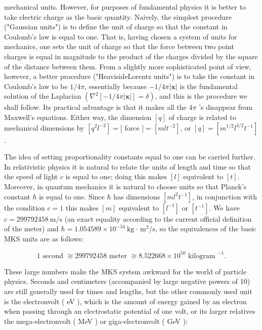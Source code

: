\documentclass[10pt, letterpaper]{article}
\begin{document}
mechanical units. However, for purposes of fundamental physics it is better to take electric charge as the basic quantity. Naively, the simplest procedure ("Gaussian units") is to define the unit of charge so that the constant in Coulomb's law is equal to one. That is, having chosen a system of units for mechanics, one sets the unit of charge so that the force between two point charges is equal in magnitude to the product of the charges divided by the square of the distance between them. From a slightly more sophisticated point of view, however, a better procedure ("HeavisideLorentz units") is to take the constant in Coulomb's law to be $1 / 4 \pi$, essentially because $-1 / 4 \pi|\mathbf{x}|$ is the fundamental solution of the Laplacian $\left(\nabla^{2}[-1 / 4 \pi|\mathbf{x}|]=\delta\right)$, and this is the procedure we shall follow. Its practical advantage is that it makes all the $4 \pi$ 's disappear from Maxwell's equations. Either way, the dimension $[q]$ of charge is related to mechanical dimensions by $\left[q^{2} l^{-2}\right]=[$ force $]=\left[m l t^{-2}\right]$, or $[q]=\left[m^{1 / 2} l^{3 / 2} t^{-1}\right]$.

The idea of setting proportionality constants equal to one can be carried further. In relativistic physics it is natural to relate the units of length and time so that the speed of light $c$ is equal to one; doing this makes $[l]$ equivalent to $[t]$. Moreover, in quantum mechanics it is natural to choose units so that Planck's constant $\hbar$ is equal to one. Since $\hbar$ has dimensions $\left[m l^{2} t^{-1}\right]$, in conjunction with the condition $c=1$ this makes $[m]$ equivalent to $\left[l^{-1}\right]$ or $\left[t^{-1}\right]$. We have $c=299792458 \mathrm{~m} / \mathrm{s}$ (an exact equality according to the current official definition of the meter) and $\hbar=1.054589 \times 10^{-34} \mathrm{~kg} \cdot \mathrm{~m}^{2} / \mathrm{s}$, so the equivalences of the basic MKS units are as follows:

$$
1 \text { second } \cong 299792458 \text { meter } \cong 8.522668 \times 10^{50} \text { kilogram }^{-1} .
$$

These large numbers make the MKS system awkward for the world of particle physics. Seconds and centimeters (accompanied by large negative powers of 10) are still generally used for times and lengths, but the other commonly used unit is the electronvolt ( eV ), which is the amount of energy gained by an electron when passing through an electrostatic potential of one volt, or its larger relatives the mega-electronvolt ( MeV ) or giga-electronvolt ( GeV ):
\end{document}
